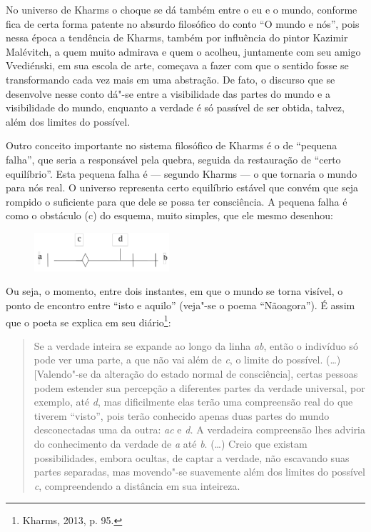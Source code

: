 {No universo de Kharms o choque se dá também entre o eu e o mundo,
conforme fica de certa forma patente no absurdo filosófico do conto ``O
mundo e nós'', pois nessa época a tendência de Kharms, também por
influência do pintor Kazimir Malévitch, a quem muito admirava e quem o
acolheu, juntamente com seu amigo Vvediénski, em sua escola de arte,
começava a fazer com que o sentido fosse se transformando cada vez mais
em uma abstração. De fato, o discurso que se desenvolve nesse conto
dá"-se entre a visibilidade das partes do mundo e a visibilidade do
mundo, enquanto a verdade é só passível de ser obtida, talvez, além dos
limites do possível.

Outro conceito importante no sistema filosófico de Kharms é o de
``pequena falha'', que seria a responsável pela quebra, seguida da
restauração de ``certo equilíbrio''. Esta pequena falha é --- segundo
Kharms --- o que tornaria o mundo para nós real. O universo representa
certo equilíbrio estável que convém que seja rompido o suficiente para
que dele se possa ter consciência. A pequena falha é como o obstáculo
(c) do esquema, muito simples, que ele mesmo desenhou:

\begin{figure}[!ht]
\centering
  \includegraphics[width=50mm]{./imgs/fig6.jpg}
\end{figure}

Ou seja, o momento, entre dois instantes, em que o mundo se torna
visível, o ponto de encontro entre ``isto e aquilo'' (veja"-se o poema
``Nãoagora''). É assim que o poeta se explica em seu diário\footnote{Kharms, 2013, p. 95.}:

\begin{quote}
Se a verdade inteira se expande ao longo da linha \emph{ab}, então o
indivíduo só pode ver uma parte, a que não vai além de \emph{c}, o
limite do possível. (\ldots{}) {[}Valendo"-se da alteração do estado
normal de consciência{]}, certas pessoas podem estender sua percepção a
diferentes partes da verdade universal, por exemplo, até \emph{d}, mas
dificilmente elas terão uma compreensão real do que tiverem ``visto'',
pois terão conhecido apenas duas partes do mundo desconectadas uma da
outra: \emph{ac} e \emph{d.} A verdadeira compreensão lhes adviria do
conhecimento da verdade de \emph{a} até \emph{b}. (\ldots{}) Creio que
existam possibilidades, embora ocultas, de captar a verdade, não
escavando suas partes separadas, mas movendo"-se suavemente além dos
limites do possível \emph{c}, compreendendo a distância em sua
inteireza.



\end{quote}}
